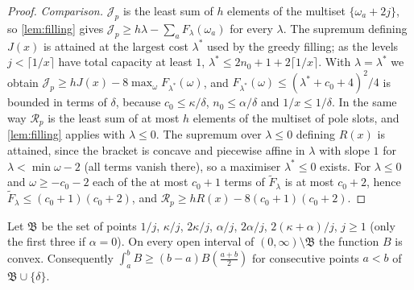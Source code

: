 \begin{proof}
\emph{Comparison.} $\mathcal J_p$ is the least sum of $h$ elements of the multiset
$\{\omega_a+2j\}$, so \cref{lem:filling} gives $\mathcal J_p\ge h\lambda-\sum_aF_\lambda(\omega_a)$
for every $\lambda$. The supremum defining $J(x)$ is attained at the largest cost $\lambda^*$ used
by the greedy filling; as the levels $j<\lceil1/x\rceil$ have total capacity at least $1$,
$\lambda^*\le2n_0+1+2\lceil1/x\rceil$. With $\lambda=\lambda^*$ we obtain $\mathcal J_p\ge
hJ(x)-8\max_\omega F_{\lambda^*}(\omega)$, and $F_{\lambda^*}(\omega)\le(\lambda^*+c_0+4)^2/4$ is
bounded in terms of $\delta$, because $c_0\le\kappa/\delta$, $n_0\le\alpha/\delta$ and
$1/x\le1/\delta$. In the same way $\mathcal R_p$ is the least sum of at most $h$ elements of the
multiset of pole slots, and \cref{lem:filling} applies with $\lambda\le0$. The supremum over
$\lambda\le0$ defining $R(x)$ is attained, since the bracket is concave and piecewise affine in
$\lambda$ with slope $1$ for $\lambda<\min\omega-2$ (all terms vanish there), so a maximiser
$\lambda^*\le0$ exists. For $\lambda\le0$ and $\omega\ge-c_0-2$ each of the at most $c_0+1$
terms of $\widetilde F_\lambda$ is at most $c_0+2$, hence
$\widetilde F_\lambda\le(c_0+1)(c_0+2)$, and $\mathcal R_p\ge hR(x)-8(c_0+1)(c_0+2)$.
\end{proof}

\begin{lemma}\label{lem:convexity}
Let $\mathfrak B$ be the set of points $1/j$, $\kappa/j$, $2\kappa/j$, $\alpha/j$, $2\alpha/j$,
$2(\kappa+\alpha)/j$, $j\ge1$ (only the first three if $\alpha=0$). On every open interval of
$(0,\infty)\setminus\mathfrak B$ the function $B$ is convex. Consequently
$\int_a^bB\ge(b-a)B(\frac{a+b}2)$ for consecutive points $a<b$ of $\mathfrak B\cup\{\delta\}$.
\end{lemma}

